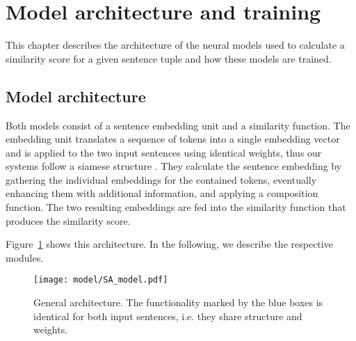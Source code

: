 \section{Model architecture and training}
This chapter describes the architecture of the neural models used to calculate a similarity score for a given sentence tuple and how these models are trained. 

\subsection{Model architecture} \label{subsec:architecture}
Both models consist of a sentence embedding unit and a similarity function. The embedding unit translates a sequence of tokens into a single embedding vector and is applied to the two input sentences using identical weights, thus our systems follow a siamese structure \autocite{bromley_signature_1994}. %
They calculate the sentence embedding by gathering the individual embeddings for the contained tokens, eventually enhancing them with additional information, and applying a composition function. The two resulting embeddings are fed into the similarity function that produces the similarity score. 

Figure~\ref{fig:model_architecture} shows this architecture. In the following, we describe the respective modules. 

\begin{figure}[htb!]
	\centering
	\texttt{[image: model/SA\_model.pdf]}
	\caption{General architecture. The functionality marked by the blue boxes is identical for both input sentences, i.e. they share structure and weights.}
	\label{fig:model_architecture}
\end{figure}

